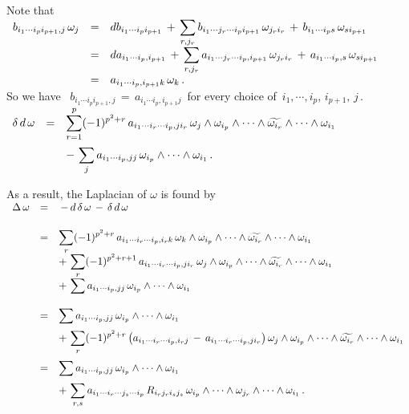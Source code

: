 \documentclass{article}[12pt,a4paper]
\begin{document}
Note that \\[0.1in]
$\begin{array}{rcl}
b_{i_1\cdots i_p i_{p+1}, j}\, \omega_j &=& \displaystyle 
	db_{i_1\cdots i_p i_{p+1}} \,+\, \sum_{r,j_r} b_{i_1\cdots j_r\cdots i_p i_{p+1}} \, \omega_{j_r i_r}
	\,+\, b_{i_1\cdots i_p s}\, \omega_{s i_{p+1}} \\[0.1in]
&=& \displaystyle 
	da_{i_1\cdots i_p, i_{p+1}} \,+\, \sum_{r,j_r} a_{i_1\cdots j_r\cdots i_p, i_{p+1}}\, \omega_{j_r i_r} 
	\,+\, a_{i_1\cdots i_p,s}\, \omega_{s i_{p+1}} \\[0.1in]
&=& \displaystyle 
	a_{i_1\cdots i_p, i_{p+1}k} \, \omega_k \,.
\end{array}$ \\[0.1in]

So we have \, $b_{i_1\cdots i_p i_{p+1},j} \,=\, a_{i_1\cdots i_p, i_{p+1}j}$\, 
for every choice of \,$i_1, \cdots, i_p,\, i_{p+1} ,\, j$\,. \\[0.1in]
$\begin{array}{rcl}
\delta \, d\, \omega &=& \displaystyle
	\sum_{r=1}^p (-1)^{p^2+r}\, a_{i_1\cdots i_r\cdots i_p, ji_r}\, 
	\omega_{j} \wedge \omega_{i_p} \wedge\cdots\wedge \widetilde{\omega_{i_r}} \wedge\cdots\wedge \omega_{i_1} \\[0.2in]
&& \displaystyle 
	-\, \sum_j a_{i_1 \cdots i_p, jj}\,	\omega_{i_p} \wedge\cdots\wedge \omega_{i_1} \,.
\end{array}$ \\
\newpage 

As a result, the Laplacian of $\omega$ is found by \\[0.1in]
$\begin{array}{rcl}
\Delta\, \omega &=& \, -\, d\,\delta\, \omega \,-\, \delta\, d\, \omega \\[0.2in]
&=& \displaystyle
	\sum_r (-1)^{p^2+r}\, a_{i_1\cdots i_r\cdots i_p, i_rk}\,
	\omega_k \wedge \omega_{i_p}\wedge\cdots\wedge \widetilde{\omega_{i_r}} \wedge\cdots\wedge \omega_{i_1} \\[0.1in]
&&\displaystyle 
	+\, \sum_r (-1)^{p^2+r+1}\, a_{i_1\cdots i_r\cdots i_p, ji_r}\, 
	\omega_{j} \wedge \omega_{i_p} \wedge\cdots\wedge \widetilde{\omega_{i_r}} \wedge\cdots\wedge \omega_{i_1} \\[0.1in]
&& \displaystyle 
	+\, \sum a_{i_1 \cdots i_p, jj}\,	\omega_{i_p} \wedge\cdots\wedge \omega_{i_1}  \\[0.2in]
&=& \displaystyle 
	\sum a_{i_1 \cdots i_p, jj}\,	\omega_{i_p} \wedge\cdots\wedge \omega_{i_1} \\[0.1in]
&&\displaystyle 
	+\, \sum_r (-1)^{p^2+r}\, \big(a_{i_1\cdots i_r \cdots i_p, i_rj} \,-\, a_{i_1\cdots i_r\cdots i_p, ji_r}\big)\,
	\omega_{j} \wedge \omega_{i_p} \wedge\cdots\wedge \widetilde{\omega_{i_r}} \wedge\cdots\wedge \omega_{i_1} \\[0.2in]
&=& \displaystyle 
	\sum a_{i_1 \cdots i_p, jj}\,	\omega_{i_p} \wedge\cdots\wedge \omega_{i_1} \\[0.1in]
&&\displaystyle +\, \sum_{r,s} a_{i_1\cdots i_r \cdots j_s \cdots i_p}\, R_{i_r j_r i_s j_s} \,
	\omega_{i_p} \wedge\cdots\wedge  \omega_{j_r} \wedge\cdots\wedge \omega_{i_1} \,.\\
\end{array}$  \\[0.1in]
\end{document}
